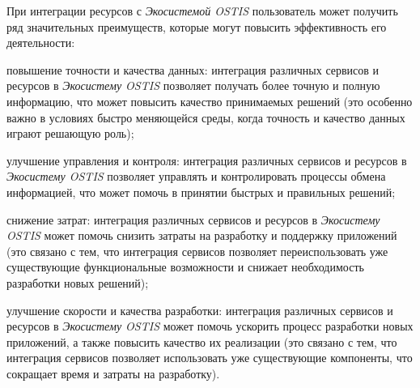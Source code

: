 При интеграции ресурсов с \textit{Экосистемой OSTIS} пользователь может получить ряд значительных преимуществ, которые могут повысить эффективность его деятельности:
\begin{textitemize}
	\item повышение точности и качества данных: интеграция различных сервисов и ресурсов в \textit{Экосистему OSTIS} позволяет получать более точную и полную информацию, что может повысить качество принимаемых решений (это особенно важно в условиях быстро меняющейся среды, когда точность и качество данных играют решающую роль);
	\item улучшение управления и контроля: интеграция различных сервисов и ресурсов в \textit{Экосистему OSTIS} позволяет управлять и контролировать процессы обмена информацией, что может помочь в принятии быстрых и правильных решений;
	\item снижение затрат: интеграция различных сервисов и ресурсов в \textit{Экосистему OSTIS} может помочь снизить затраты на разработку и поддержку приложений (это связано с тем, что интеграция сервисов позволяет переиспользовать уже существующие функциональные возможности и снижает необходимость разработки новых решений);
	\item улучшение скорости и качества разработки: интеграция различных сервисов и ресурсов в \textit{Экосистему OSTIS} может помочь ускорить процесс разработки новых приложений, а также повысить качество их реализации (это связано с тем, что интеграция сервисов позволяет использовать уже существующие компоненты, что сокращает время и затраты на разработку).
\end{textitemize}
